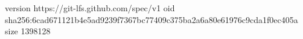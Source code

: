 version https://git-lfs.github.com/spec/v1
oid sha256:6cad671121b4e5ad9239f7367bc77409c375ba2a6a80e61976c9cda1f0ec405a
size 1398128
